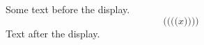 \documentclass[12pt]{article}
\begin{document}
Some text before the display.
\[ \big( \Big( \bigg( \Bigg( x \Bigg) \bigg) \Big) \big) \]
Text after the display.
\end{document}

